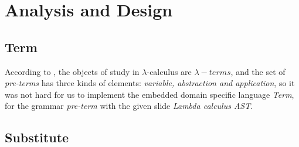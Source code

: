 \documentclass{article}
\begin{document}




\section{Analysis and Design}
\subsection{Term}



According to \cite{sorensen2006lectures}, the objects of study in $\lambda$-calculus are $\lambda-terms$, and the set of \emph{pre-terms} has three kinds of elements: \emph{variable, abstraction and application}, so it was not hard for us to implement the embedded domain specific language \emph{Term}, for the grammar \emph{pre-term} with the given slide \emph{Lambda calculus AST}.

\subsection{Substitute}
\end{document}
